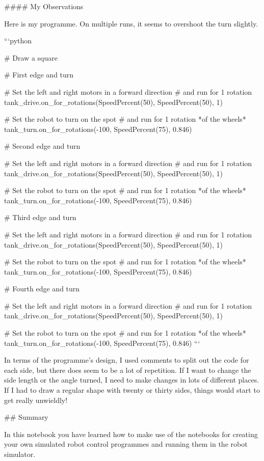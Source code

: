 \documentclass[letterpaper,10pt,english]{sphinxmanual}
\begin{document}
{#### My Observations


Here is my programme. On multiple runs, it seems to overshoot the turn slightly.

```python

# Draw a square


# First edge and turn

# Set the left and right motors in a forward direction
# and run for 1 rotation
tank_drive.on_for_rotations(SpeedPercent(50), SpeedPercent(50), 1)

# Set the robot to turn on the spot
# and run for 1 rotation *of the wheels*
tank_turn.on_for_rotations(-100, SpeedPercent(75), 0.846)



# Second edge and turn

# Set the left and right motors in a forward direction
# and run for 1 rotation
tank_drive.on_for_rotations(SpeedPercent(50), SpeedPercent(50), 1)


# Set the robot to turn on the spot
# and run for 1 rotation *of the wheels*
tank_turn.on_for_rotations(-100, SpeedPercent(75), 0.846)


# Third edge and turn

# Set the left and right motors in a forward direction
# and run for 1 rotation
tank_drive.on_for_rotations(SpeedPercent(50), SpeedPercent(50), 1)

# Set the robot to turn on the spot
# and run for 1 rotation *of the wheels*
tank_turn.on_for_rotations(-100, SpeedPercent(75), 0.846)



# Fourth edge and turn

# Set the left and right motors in a forward direction
# and run for 1 rotation
tank_drive.on_for_rotations(SpeedPercent(50), SpeedPercent(50), 1)


# Set the robot to turn on the spot
# and run for 1 rotation *of the wheels*
tank_turn.on_for_rotations(-100, SpeedPercent(75), 0.846)
```

In terms of the programme's design, I used comments to split out the code for each side, but there does seem to be a lot of repetition. If I want to change the side length or the angle turned, I need to make changes in lots of different places. If I had to draw a regular shape with twenty or thirty sides, things would start to get really unwieldly!

## Summary


In this notebook you have learned how to make use of the notebooks for creating your own simulated robot control programmes and running them in the robot simulator.

}
\end{document}
